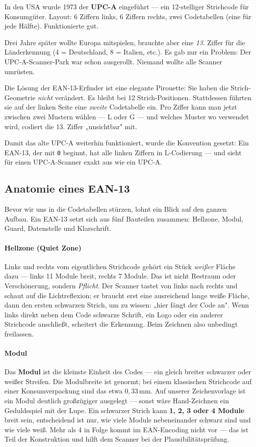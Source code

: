 In den USA wurde 1973 der \textbf{UPC-A} eingeführt — ein 12-stelliger
Strichcode für Konsumgüter. Layout: 6 Ziffern links, 6 Ziffern rechts,
zwei Codetabellen (eine für jede Hälfte). Funktionierte gut.

Drei Jahre später wollte Europa mitspielen, brauchte aber eine
\emph{13.} Ziffer für die Länderkennung (4 = Deutschland, 8 =
Italien, etc.). Es gab nur ein Problem: Der UPC-A-Scanner-Park war
schon ausgerollt. Niemand wollte alle Scanner umrüsten.

Die Lösung der EAN-13-Erfinder ist eine elegante Pirouette: Sie haben
die Strich-Geometrie \emph{nicht} verändert. Es bleibt bei 12
Strich-Positionen. Stattdessen führten sie auf der linken Seite eine
\emph{zweite} Codetabelle ein. Pro Ziffer kann man jetzt zwischen
zwei Mustern wählen — L oder G — und welches Muster wo verwendet
wird, codiert die 13. Ziffer „unsichtbar" mit.

Damit das alte UPC-A weiterhin funktioniert, wurde die Konvention
gesetzt: Ein EAN-13, der mit \texttt{0} beginnt, hat alle linken
Ziffern in L-Codierung — und sieht für einen UPC-A-Scanner exakt aus
wie ein UPC-A.

\subsection*{Anatomie eines EAN-13}

Bevor wir uns in die Codetabellen stürzen, lohnt ein Blick auf den
ganzen Aufbau. Ein EAN-13 setzt sich aus fünf Bauteilen zusammen:
Hellzone, Modul, Guard, Datenstelle und Klarschrift.

\paragraph{Hellzone (Quiet Zone)}
Links und rechts vom eigentlichen Strichcode gehört ein Stück
\emph{weißer} Fläche dazu — links 11 Module breit, rechts 7 Module.
Das ist nicht Restraum oder Verschönerung, sondern \emph{Pflicht}.
Der Scanner tastet von links nach rechts und schaut auf die Lichtreflexion;
er braucht erst eine ausreichend lange weiße Fläche, dann den ersten
schwarzen Strich, um zu wissen: „hier fängt der Code an". Wenn links
direkt neben dem Code schwarze Schrift, ein Logo oder ein anderer
Strichcode anschließt, scheitert die Erkennung. Beim Zeichnen also
unbedingt freilassen.

\paragraph{Modul}
Das \textbf{Modul} ist die kleinste Einheit des Codes — ein gleich
breiter schwarzer oder weißer Streifen. Die Modulbreite ist genormt;
bei einem klassischen Strichcode auf einer Konsumverpackung sind das
etwa $0{,}33$\,mm. Auf unserer Zeichenvorlage ist ein Modul deutlich
großzügiger ausgelegt — sonst wäre Hand-Zeichnen ein Geduldsspiel mit
der Lupe. Ein schwarzer Strich kann \textbf{1, 2, 3 oder 4 Module}
breit sein, entscheidend ist nur, wie viele Module nebeneinander
schwarz sind und wie viele weiß. Mehr als 4 in Folge kommt im
EAN-Encoding nicht vor — das ist Teil der Konstruktion und hilft dem
Scanner bei der Plausibilitätsprüfung.

